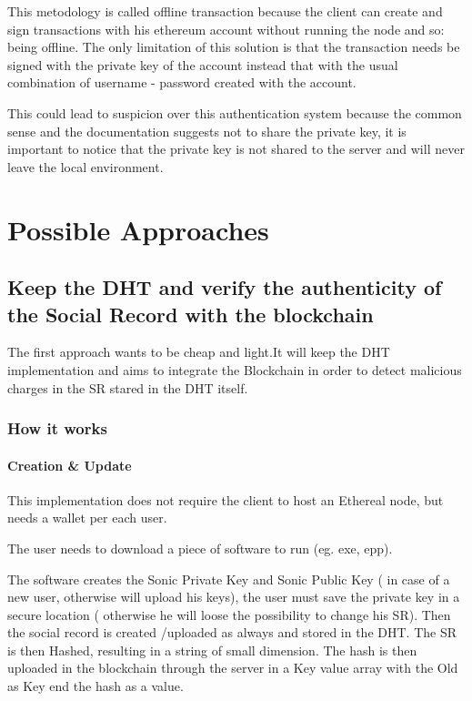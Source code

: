 This metodology is called offline transaction because the client can create and sign transactions with his ethereum account without running the node and so: being offline. The only limitation of this solution is that the transaction needs be signed with the private key of the account instead that with the usual combination of username - password created with the account.

This could lead to suspicion over this authentication system because the common sense and the documentation suggests not to share the private key, it is important to notice that the private key is not shared to the server and will never leave the local environment.


\section{Possible Approaches}
\subsection{Keep the DHT and verify the authenticity of the Social Record with the blockchain}
The first approach wants to be cheap and light.It will keep the DHT implementation and aims to integrate the Blockchain in order to detect malicious charges in the SR stared in the DHT itself.

\subsubsection{How it works}
\paragraph{Creation \& Update}

This implementation does not require the client to host an Ethereal node, but needs a wallet per each user.

The user needs to download a piece of software to run (eg. exe, epp).

The software creates the Sonic Private Key and Sonic Public Key ( in case of a new user, otherwise will upload his keys), the user must save the private key in a secure location ( otherwise he will loose the possibility to change his SR).
Then the social record is created /uploaded as always and stored in the DHT.
The SR is then Hashed, resulting in a string of small dimension.
The hash is then uploaded in the blockchain through the server in a Key value array with the Old as Key end the hash as a value.

